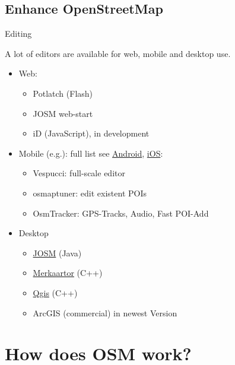 \documentclass{beamer}
\begin{document}
  \subsection{Enhance OpenStreetMap}

\begin{frame}{Editing}

  A lot of editors are available for web, mobile and desktop use.

  \begin{itemize}
    \item Web:
    \begin{itemize}
      \item Potlatch (Flash)
      \item JOSM web-start
      \item iD (JavaScript), in development
    \end{itemize}
    \item Mobile (e.g.): full list see  \href{http://wiki.openstreetmap.org/wiki/Android\#OpenStreetMap\_editing\_features}{Android}, \href{http://wiki.openstreetmap.org/wiki/Apple\_iOS\#OpenStreetMap\_editing\_features}{iOS}:
    \begin{itemize}
      \item Vespucci: full-scale editor
      \item osmaptuner: edit existent POIs
      \item OsmTracker: GPS-Tracks, Audio, Fast POI-Add
    \end{itemize}
  \item Desktop
    \begin{itemize}
      \item \href{http://josm.openstreetmap.de}{JOSM} (Java)
      \item \href{http://merkaartor.be}{Merkaartor} (C++)
      \item \href{http://www.qgis.org/}{Qgis} (C++)
      \item ArcGIS (commercial) in newest Version
    \end{itemize}
  \end{itemize}

\end{frame}

\section{How does OSM work?}
\end{document}
